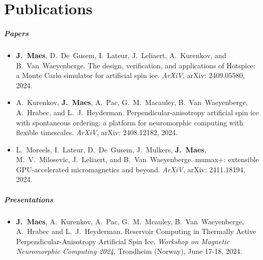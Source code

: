 \chapter{Publications}
\renewcommand{\bibitem}[1]{\item}

\paragraph*{Papers}
\begin{itemize}
    \bibitem{MAES-24}
    \textbf{J.~Maes}, D.~De~Gusem, I.~Lateur, J.~Leliaert, A.~Kurenkov, and B.~Van~Waeyenberge.
    \newblock The design, verification, and applications of Hotspice: a Monte Carlo simulator for artificial spin ice.
    \newblock \emph{ArXiV}, arXiv: 2409.05580, 2024.

    \bibitem{KUR-24}
    A.~Kurenkov, \textbf{J.~Maes}, A.~Pac, G.~M.~Macauley, B.~Van~Waeyenberge, A.~Hrabec, and L.~J.~Heyderman.
    \newblock Perpendicular-anisotropy artificial spin ice with spontaneous ordering: a platform for neuromorphic computing with flexible timescales.
    \newblock \emph{ArXiV}, arXiv: 2408.12182, 2024.

    \bibitem{MOR-24}
    L.~Moreels, I.~Lateur, D.~De~Gusem, J.~Mulkers, \textbf{J.~Maes}, M.~V.~Milosevic, J.~Leliaert, and B.~Van~Waeyenberge.
    \newblock mumax+: extensible GPU-accelerated micromagnetics and beyond.
    \newblock \emph{ArXiV}, arXiv: 2411.18194, 2024.
\end{itemize}

\paragraph*{Presentations}
\begin{itemize}
    \bibitem{SPINENGINE-24}
    \textbf{J.~Maes}, A.~Kurenkov, A.~Pac, G.~M.~Mcauley, B.~Van~Waeyenberge, A.~Hrabec and L.~J.~Heyderman.
    \newblock Reservoir Computing in Thermally Active Perpendicular-Anisotropy Artificial Spin Ice.
    \newblock \emph{Workshop on Magnetic Neuromorphic Computing 2024}, Trondheim (Norway), June 17-18, 2024.
\end{itemize}


